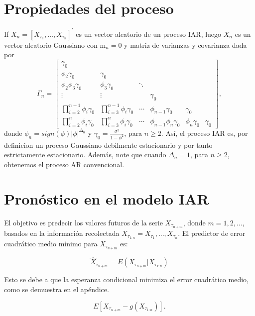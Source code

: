 \section{Propiedades del proceso}
If $X_n=\left[X_{\tau_1}, \ldots, X_{\tau_n}\right]^{\prime}$ es un vector aleatorio de un proceso IAR, 
luego $X_n$ es un vector aleatorio Gaussiano con $\mathrm{m}_n=0$ y matriz de varianzas y covarianza
dada por
$$
\Gamma_n=\left[\begin{array}{cccccc}
\gamma_0 & & & & & \\
\phi_2 \gamma_0 & \gamma_0 & & & & \\
\phi_2\phi_3 \gamma_0 & \phi_3\gamma_0 & \ddots & & & \\
\vdots & \vdots & & \gamma_0 & & \\
\prod_{i=2}^{n-1}\phi_i \gamma_0 & \prod_{i=3}^{n-1}\phi_i \gamma_0 & \cdots & \phi_{n-1}\gamma_0 & \gamma_0 & \\
\prod_{i=2}^{n}\phi_i  \gamma_0 & \prod_{i=3}^{n}\phi_i  \gamma_0 & \cdots & \phi_{n-1}\phi_{n}\gamma_0 & \phi_{n}\gamma_0 & \gamma_0
\end{array}\right],
$$
donde $\phi_{n} = sign(\phi)|\phi|^{\Delta_{n}}$ y $\gamma_0=\frac{\sigma^2}{1-\phi^2}$, para $n \geq 2$. Así,
el proceso IAR es, por definicion un proceso Gaussiano debilmente estacionario y por tanto estrictamente estacionario.
Además, note que cuando $\Delta_n=1$, para $n \geq 2$, obtenemos el proceso AR convencional.

\section{Pronóstico en el modelo IAR}

El objetivo es predecir los valores futuros de la serie $X_{\tau_{n+m}}$,
 donde $m = 1,2,...$, basados en la información recolectada $X_{\tau_{1:n}} = { X_{\tau_1}, ..., X_{\tau_n} }$. 
 El predictor de error cuadrático medio mínimo para $X_{\tau_{n+m}}$ es:

\begin{equation}
\hat{X}_{\tau_{n+m}} = E(X_{\tau_{n+m}}|X_{\tau_{1:n}})
\label{eq:predictorIAR}
\end{equation}

Esto se debe a que la esperanza condicional minimiza el error cuadrático medio, como se demuestra en el apéndice.

\begin{equation}
E \left[ X_{\tau_{n+m}} - g\left( X_{\tau_{1:n}} \right) \right].
\label{eq:ecmIAR}
\end{equation}

